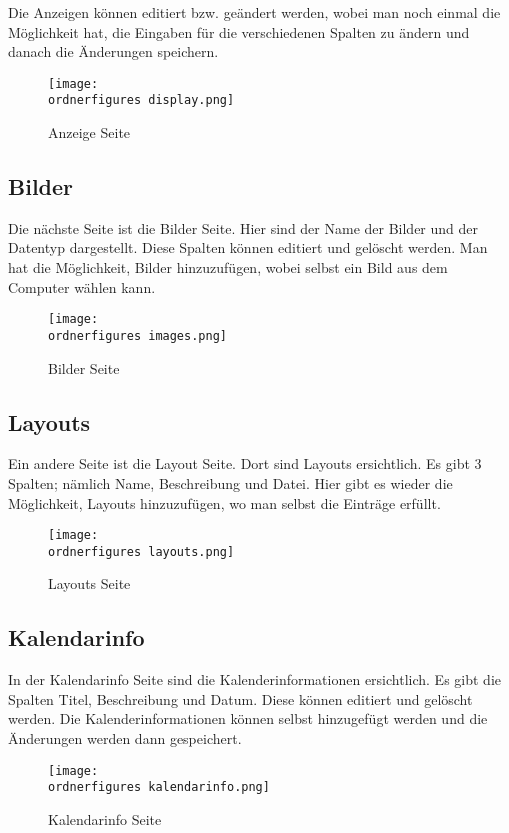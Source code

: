 Die Anzeigen können editiert bzw. geändert werden, wobei man noch einmal die Möglichkeit hat, die Eingaben für die verschiedenen Spalten zu ändern und danach die Änderungen speichern.

\begin{figure}[H]
	\centering
	\texttt{[image: \\ordnerfigures display.png]}
	\caption{Anzeige Seite}
	\label{fi:anzeige}
\end{figure}


\subsection{Bilder}

Die nächste Seite ist die Bilder Seite. Hier sind der Name der Bilder und der Datentyp dargestellt. Diese Spalten können editiert und gelöscht werden. Man hat die Möglichkeit, Bilder hinzuzufügen, wobei selbst ein Bild aus dem Computer wählen kann.

\begin{figure}[H]
	\centering
	\texttt{[image: \\ordnerfigures images.png]}
	\caption{Bilder Seite}
	\label{fi:images}
\end{figure}


\subsection{Layouts}
Ein andere Seite ist die Layout Seite. Dort sind Layouts ersichtlich. Es gibt 3 Spalten; nämlich Name, Beschreibung und Datei. Hier gibt es wieder die Möglichkeit, Layouts hinzuzufügen, wo man selbst die Einträge erfüllt.

\begin{figure}[H]
	\centering
	\texttt{[image: \\ordnerfigures layouts.png]}
	\caption{Layouts Seite}
	\label{fi:layouts}
\end{figure}

\subsection{Kalendarinfo}

In der Kalendarinfo Seite sind die Kalenderinformationen ersichtlich. Es gibt die Spalten Titel, Beschreibung und Datum. Diese können editiert und gelöscht werden. Die Kalenderinformationen können selbst hinzugefügt werden und die Änderungen werden dann gespeichert.

\begin{figure}[H]
	\centering
	\texttt{[image: \\ordnerfigures kalendarinfo.png]}
	\caption{Kalendarinfo Seite}
	\label{fi:kalendar}
\end{figure}

